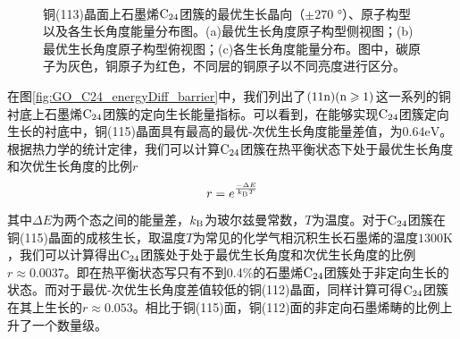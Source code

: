         \begin{figure}[htb]
            \\[-0.5ex]
            \caption{铜(113)晶面上石墨烯$\rm{C_{24}}$团簇的最优生长晶向（$\pm 270$ \si{\degree}）、原子构型以及各生长角度能量分布图。(a)最优生长角度原子构型侧视图；(b)最优生长角度原子构型俯视图；(c)各生长角度能量分布。图中，碳原子为灰色，铜原子为红色，不同层的铜原子以不同亮度进行区分。}
            \label{GO_C24_113}
        \end{figure}
        在图\ref{fig:GO_C24_energyDiff_barrier}中，我们列出了$\rm{(11n)(n \geqslant 1)}$这一系列的铜衬底上石墨烯$\rm{C_{24}}$团簇的定向生长能量指标。可以看到，在能够实现$\rm{C_{24}}$团簇定向生长的衬底中，铜(115)晶面具有最高的最优-次优生长角度能量差值，为$0.64 \si{\electronvolt}$。根据热力学的统计定律，我们可以计算$\rm{C_{24}}$团簇在热平衡状态下处于最优生长角度和次优生长角度的比例$r$\chinesecolon
        \begin{equation}
            r=e^{\frac{-\Delta E}{k_{\rm B}T}}
        \end{equation}
        其中$\Delta E$为两个态之间的能量差，$k_{\rm B}$为玻尔兹曼常数，$T$为温度。对于$\rm{C_{24}}$团簇在铜(115)晶面的成核生长，取温度$T$为常见的化学气相沉积生长石墨烯的温度$1300 \si{\kelvin}$，我们可以计算得出$\rm{C_{24}}$团簇处于处于最优生长角度和次优生长角度的比例$r\approx 0.0037$。即在热平衡状态写只有不到0.4\%的石墨烯$\rm{C_{24}}$团簇处于非定向生长的状态。而对于最优-次优生长角度差值较低的铜(112)晶面，同样计算可得$\rm{C_{24}}$团簇在其上生长的$r\approx 0.053$。相比于铜(115)面，铜(112)面的非定向石墨烯畴的比例上升了一个数量级。
        
